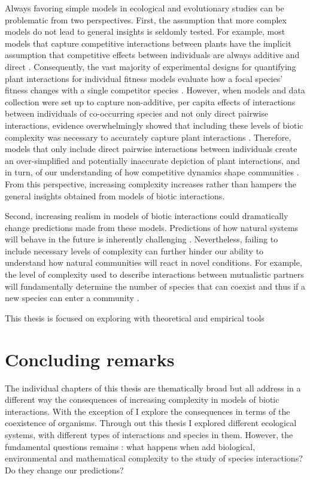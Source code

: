 \documentclass[12pt]{article}
\begin{document}
Always favoring simple models in ecological and evolutionary studies can be problematic from two perspectives. First, the assumption that more complex models do not lead to general insights is seldomly tested. For example, most models that capture competitive interactions between plants have the implicit assumption that competitive effects between individuals are always additive and direct \citep{schoener1974some,freckleton2001predicting,kraft2015plant}. Consequently, the vast majority of experimental designs for quantifying plant interactions for individual fitness models evaluate how a focal species’ fitness changes with a single competitor species  \citep{freckleton2001predicting,hart2018quantify}. However, when models and data collection were set up to capture non-additive, per capita effects of interactions between individuals of co-occurring species and not only direct pairwise interactions, evidence overwhelmingly showed that including these levels of biotic complexity was necessary to accurately capture plant interactions \citep{mayfield2017higher,martyn2021identifying,lai2021non}. Therefore, models that only include direct pairwise interactions between individuals create an over-simplified and potentially inaccurate depiction of plant interactions, and in turn, of our understanding of how competitive dynamics shape communities \citep{martyn2021identifying}. From this perspective, increasing complexity increases rather than hampers the general insights obtained from models of biotic interactions.


Second, increasing realism in models of biotic interactions could dramatically change predictions made from these models. Predictions of how natural systems will behave in the future is inherently challenging \citep{sutherland2006predicting,evans2012predictive}. Nevertheless, failing to include necessary levels of complexity can further hinder our ability to understand how natural communities will react in novel conditions. For example, the level of complexity used to describe interactions between mutualistic partners will fundamentally determine the number of species that can coexist  and thus if a new species can enter a community  \citep{holland2006comment,bascompte2006response, bastolla2009architecture}.

This thesis is focused on exploring with theoretical and empirical tools 



\section*{Concluding remarks}
The individual chapters of this thesis are thematically broad but all address in a different way the consequences of increasing complexity in models of biotic interactions. With the exception of  I explore the consequences in terms of the coexistence of organisms. Through out this thesis I explored different ecological systems, with different types of interactions and species in them. However, the fundamental questions remains : what happens when add biological, environmental and mathematical complexity to the study of species interactions? Do they change our predictions?




\clearpage


\end{document}
